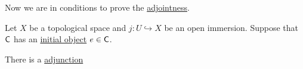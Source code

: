 \documentclass[../../main]{subfiles}
\begin{document}
Now we are in conditions to prove the \hyperref[def:adjoint-functors]{adjointness}.
\begin{theorem}\label{thm:open-immersion-adjunction-presheaf}
  Let \(X\) be a topological space and \(j\colon U \hookrightarrow X\) be an open immersion.
  Suppose that \(\mathsf{C}\) has an \hyperref[def:initial-terminal-object]{initial object} \(e \in \mathsf{C}\).

  There is a \hyperref[def:adjoint-functors]{adjunction}
  \begin{center}
  \end{center}
\end{theorem}
\end{document}
